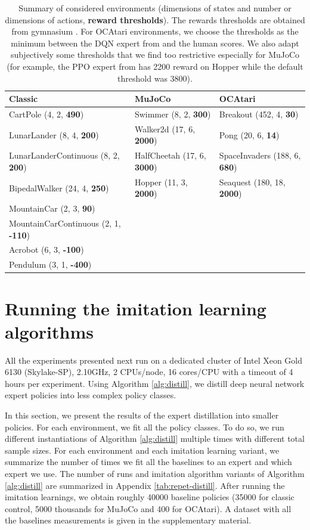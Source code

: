 \begin{table}[ht]
  \centering
  \small
  \begin{tabular}{lll}
  \hline
  \textbf{Classic} & \textbf{MuJoCo} & \textbf{OCAtari}\\
  \hline
  CartPole (4, 2, \textbf{490}) & Swimmer (8, 2, \textbf{300}) & Breakout (452, 4, \textbf{30})\\
  LunarLander (8, 4, \textbf{200}) & Walker2d (17, 6, \textbf{2000}) & Pong (20, 6, \textbf{14})\\
  LunarLanderContinuous (8, 2, \textbf{200}) & HalfCheetah (17, 6, \textbf{3000}) & SpaceInvaders (188, 6, \textbf{680})\\
  BipedalWalker (24, 4, \textbf{250}) & Hopper (11, 3, \textbf{2000}) & Seaquest (180, 18, \textbf{2000})\\
  MountainCar (2, 3, \textbf{90}) & \\
  MountainCarContinuous (2, 1, \textbf{-110}) & \\
  Acrobot (6, 3, \textbf{-100}) & \\
  Pendulum (3, 1, \textbf{-400}) & \\
  \hline
  \end{tabular}
  \caption{Summary of considered environments (dimensions of states and number or dimensions of actions, \textbf{reward thresholds}). The rewards thresholds are obtained from gymnasium \citep{gymnasium}. For OCAtari environments, we choose the thresholds as the minimum between the DQN expert from \citet{zoo} and the human scores. We also adapt subjectively some thresholds that we find too restrictive especially for MuJoCo (for example, the PPO expert from \citet{zoo} has 2200 reward on Hopper while the default threshold was 3800).}
  \label{tab:envs}
  \end{table}


\section{Running the imitation learning algorithms}
All the experiments presented next run on a dedicated cluster of Intel Xeon Gold 6130 (Skylake-SP), 2.10GHz, 2 CPUs/node, 16 cores/CPU with a timeout of 4 hours per experiment.
Using Algorithm \ref{alg:distill}, we distill deep neural network expert policies into less complex policy classes.

In this section, we present the results of the expert distillation into smaller policies. For each environment, we fit all the policy classes. To do so, we run different instantiations of Algorithm \ref{alg:distill} multiple times with different total sample sizes. For each environment and each imitation learning variant, we summarize the number of times we fit all the baselines to an expert and which expert we use. The number of runs and imitation algorithm variants of Algorithm \ref{alg:distill} are summarized in Appendix \ref{tab:repet-distill}. After running the imitation learnings, we obtain roughly 40000 baseline policies (35000 for classic control, 5000 thousands for MuJoCo and 400 for OCAtari). A dataset with all the baselines measurements is given in the supplementary material.

